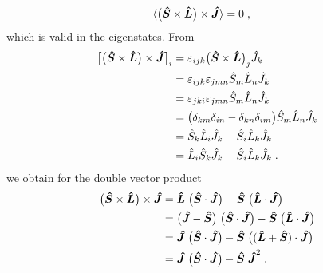 {%
\begin{align}\label{eq:para:3}
\langle \big( \vop S\times \vop L \big)\times \vop J\rangle &= 0\;,
\end{align}
%
which is valid in the eigenstates.
From 
%
\begin{align*}
\big[ \big( \vop S\times \vop L \big)\times \vop J \big]_{i}
&= \varepsilon_{ijk}\big( \vop S\times \vop L \big)_{j} \opp J_{k}\\
&= \varepsilon_{ijk}\varepsilon_{jmn}  \opp S_{m} \opp L_{n} \opp J_{k}\\
&= \varepsilon_{jki}\varepsilon_{jmn}  \opp S_{m} \opp L_{n} \opp J_{k}\\
&= \big( \delta_{km}\delta_{in}-\delta_{kn}\delta_{im} \big)  \opp S_{m} \opp L_{n} \opp J_{k}\\
&= \opp S_{k} \opp L_{i} \opp J_{k}-\opp S_{i} \opp L_{k} \opp J_{k}\\
&= \opp  L_{i} \opp S_{k}\opp J_{k}-\opp S_{i} \opp L_{k} \opp J_{k}\;.
\end{align*}
%
we obtain for the double vector product
%
\begin{align*}
 \big( \vop S\times \vop L \big)\times \vop J &= \vop L\;\big( \vop S\cdot \vop J \big)
 -\vop S\;\big( \vop L\cdot \vop J \big)\\
&=\big( \vop J-\vop S\big)\;\big( \vop S\cdot \vop J \big)
 -\vop S\;\big( \vop L\cdot \vop J \big)\\
&= \vop J\;\big( \vop S\cdot \vop J \big)
 -\vop S\;\big( (\vop L+\vop S)\cdot \vop J \big)\\
 &= \vop J\;\big( \vop S\cdot \vop J \big)
 -\vop S\; \vop J^{2} \;.
\end{align*}
%

}
